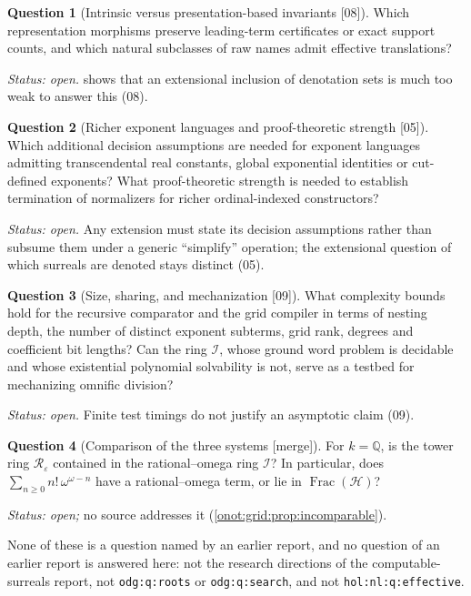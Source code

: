 \documentclass[11pt,oneside]{article}
\numberwithin{equation}{section}
\theoremstyle{definition}
\newtheorem{question}[question]{Question}
\theoremstyle{remark}
\newcommand{\Q}{\mathbb Q}
\newcommand{\FH}{\operatorname{Frac}(\mathcal H)}
\newcommand{\IO}{\mathcal I}
\newcommand{\src}[1]{\textup{\textsf{\small[#1]}}}
\newcommand{\mergetag}{\textup{\textsf{\small[merge]}}}
\newcommand{\replabel}[1]{\nolinkurl{#1}}
\begin{document}
\begin{question}[Intrinsic versus presentation-based invariants \src{08}]\label{onot:q:intrinsic}
Which representation morphisms preserve leading-term certificates or exact support
counts, and which natural subclasses of raw names admit effective translations?
\end{question}
\emph{Status: open.}  shows that an extensional
inclusion of denotation sets is much too weak to answer this (08).

\begin{question}[Richer exponent languages and proof-theoretic strength \src{05}]\label{onot:q:exponents}
Which additional decision assumptions are needed for exponent languages admitting
transcendental real constants, global exponential identities or cut-defined
exponents? What proof-theoretic strength is needed to establish termination of
normalizers for richer ordinal-indexed constructors?
\end{question}
\emph{Status: open.} Any extension must state its decision assumptions rather than
subsume them under a generic ``simplify'' operation; the extensional question of
which surreals are denoted stays distinct (05).

\begin{question}[Size, sharing, and mechanization \src{09}]\label{onot:q:complexity}
What complexity bounds hold for the recursive comparator and the grid compiler in
terms of nesting depth, the number of distinct exponent subterms, grid rank,
degrees and coefficient bit lengths? Can the ring $\IO$, whose ground word problem
is decidable and whose existential polynomial solvability is not, serve as a
testbed for mechanizing omnific division?
\end{question}
\emph{Status: open.} Finite test timings do not justify an asymptotic claim (09).

\begin{question}[Comparison of the three systems \mergetag]\label{onot:q:compare}
For $k=\Q$, is the tower ring $\mathcal R_\varepsilon$ contained in the
rational--omega ring $\IO$? In particular, does $\sum_{n\ge0}n!\,\omega^{\omega-n}$
have a rational--omega term, or lie in $\FH$?
\end{question}
\emph{Status: open;} no source addresses it (\cref{onot:grid:prop:incomparable}).

None of these is a question named by an earlier report, and no question of an
earlier report is answered here: not the research directions of the
computable-surreals report, not \replabel{odg:q:roots} or \replabel{odg:q:search},
and not \replabel{hol:nl:q:effective}.
\end{document}
